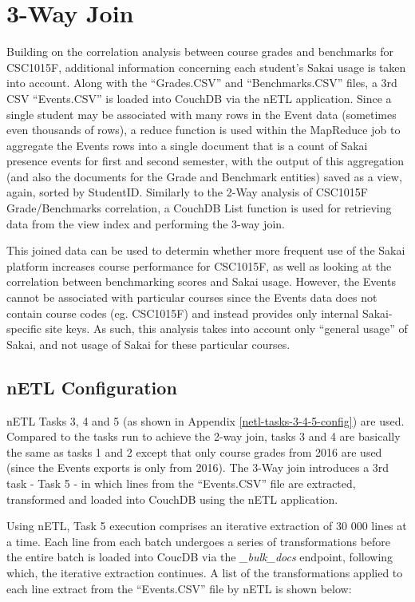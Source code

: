 \section{3-Way Join}
Building on the correlation analysis between course grades and benchmarks for CSC1015F, additional information concerning each student's Sakai usage is taken into account. Along with the ``Grades.CSV'' and ``Benchmarks.CSV'' files, a 3rd CSV ``Events.CSV'' is loaded into CouchDB via the nETL application. Since a single student may be associated with many rows in the Event data (sometimes even thousands of rows), a reduce function is used within the MapReduce job to aggregate the Events rows into a single document that is a count of Sakai presence events for first and second semester, with the output of this aggregation (and also the documents for the Grade and Benchmark entities) saved as a view, again, sorted by StudentID. Similarly to the 2-Way analysis of CSC1015F Grade/Benchmarks correlation, a CouchDB List function is used for retrieving data from the view index and performing the 3-way join.

This joined data can be used to determin whether more frequent use of the Sakai platform increases course performance for CSC1015F, as well as looking at the correlation between benchmarking scores and Sakai usage. However, the Events cannot be associated with particular courses since the Events data does not contain course codes (eg. CSC1015F) and instead provides only internal Sakai-specific site keys. As such, this analysis takes into account only ``general usage'' of Sakai, and not usage of Sakai for these particular courses.

\subsection{nETL Configuration}
nETL Tasks 3, 4 and 5 (as shown in Appendix \ref{netl-tasks-3-4-5-config}) are used. Compared to the tasks run to achieve the 2-way join, tasks 3 and 4 are basically the same as tasks 1 and 2 except that only course grades from 2016 are used (since the Events exports is only from 2016). The 3-Way join introduces a 3rd task - Task 5 - in which lines from the ``Events.CSV'' file are extracted, transformed and loaded into CouchDB using the nETL application.

Using nETL, Task 5 execution comprises an iterative extraction of 30 000 lines at a time. Each line from each batch undergoes a series of transformations before the entire batch is loaded into CoucDB via the \textit{\_bulk\_docs} endpoint, following which, the iterative extraction continues. A list of the transformations applied to each line extract from the ``Events.CSV'' file by nETL is shown below:

